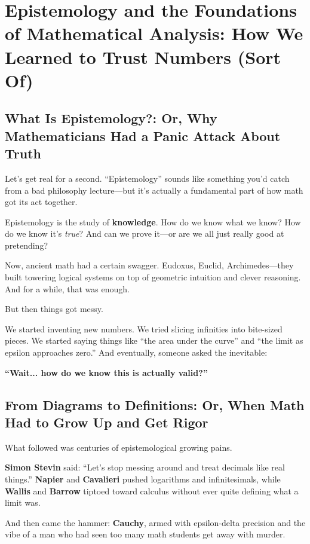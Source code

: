 \section{Epistemology and the Foundations of Mathematical Analysis: How We Learned to Trust Numbers (Sort Of)}

\subsection{What Is Epistemology?: Or, Why Mathematicians Had a Panic Attack About Truth}

Let’s get real for a second. “Epistemology” sounds like something you’d catch from a bad philosophy lecture—but it’s actually a fundamental part of how math got its act together.

Epistemology is the study of \textbf{knowledge}. How do we know what we know? How do we know it’s \emph{true}? And can we prove it—or are we all just really good at pretending?

Now, ancient math had a certain swagger. Eudoxus, Euclid, Archimedes—they built towering logical systems on top of geometric intuition and clever reasoning. And for a while, that was enough.

But then things got messy.

We started inventing new numbers. We tried slicing infinities into bite-sized pieces. We started saying things like “the area under the curve” and “the limit as epsilon approaches zero.” And eventually, someone asked the inevitable:

\textbf{“Wait... how do we know this is actually valid?”}

\subsection{From Diagrams to Definitions: Or, When Math Had to Grow Up and Get Rigor}

What followed was centuries of epistemological growing pains.

\textbf{Simon Stevin} said: “Let’s stop messing around and treat decimals like real things.”  
\textbf{Napier} and \textbf{Cavalieri} pushed logarithms and infinitesimals, while \textbf{Wallis} and \textbf{Barrow} tiptoed toward calculus without ever quite defining what a limit was.

And then came the hammer: \textbf{Cauchy}, armed with epsilon-delta precision and the vibe of a man who had seen too many math students get away with murder.

